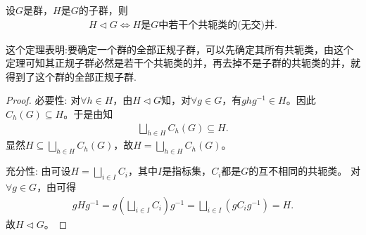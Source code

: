 \documentclass[../../main.tex]{subfiles}%
\begin{document}
\begin{theorem}\label{theorem:正规子群都是共轭类的并}
设$G$是群，$H$是$G$的子群，则
\begin{align*}
H\lhd G\Longleftrightarrow H\text{是}G\text{中若干个共轭类的(无交)并}.
\end{align*}
\end{theorem}
\begin{remark}
这个定理表明:要确定一个群的全部正规子群，可以先确定其所有共轭类，由这个定理可知其正规子群必然是若干个共轭类的并，再去掉不是子群的共轭类的并，就得到了这个群的全部正规子群.
\end{remark}
\begin{proof}

{\heiti 必要性:} 对$\forall h\in H$，由$H\lhd G$知，对$\forall g\in G$，有$ghg^{-1}\in H$。因此$C_h(G)\subseteq H$。于是由知
\begin{align*}
\bigsqcup\limits_{h\in H}C_h(G)\subseteq H.
\end{align*}
显然$H\subseteq \bigsqcup\limits_{h\in H}C_h(G)$，故$H=\bigsqcup\limits_{h\in H}C_h(G)$。

{\heiti 充分性:} 由可设$H=\bigsqcup\limits_{i\in I}C_i$，其中$I$是指标集，$C_i$都是$G$的互不相同的共轭类。
对$\forall g\in G$，由可得
\begin{align*}
gHg^{-1}=g\left( \bigsqcup\limits_{i\in I}C_i \right) g^{-1}=\bigsqcup\limits_{i\in I}\left( gC_ig^{-1} \right)=H.
\end{align*}
故$H\lhd G$。

\end{proof}
\end{document}
